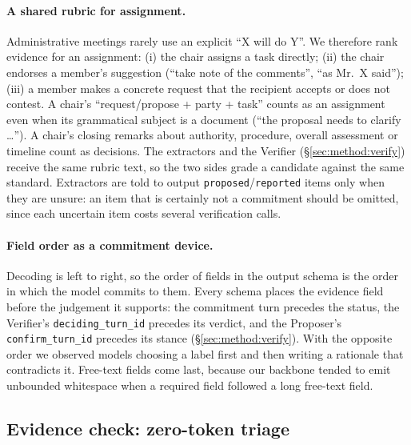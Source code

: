 \paragraph{A shared rubric for assignment.}
Administrative meetings rarely use an explicit ``X will do Y''.
We therefore rank evidence for an assignment:
(i) the chair assigns a task directly;
(ii) the chair endorses a member's suggestion (``take note of the comments'', ``as Mr.~X said'');
(iii) a member makes a concrete request that the recipient accepts or does not contest.
A chair's ``request/propose + party + task'' counts as an assignment even when its grammatical subject is a document (``the proposal needs to clarify \ldots'').
A chair's closing remarks about authority, procedure, overall assessment or timeline count as decisions.
The extractors and the Verifier (\S\ref{sec:method:verify}) receive the same rubric text, so the two sides grade a candidate against the same standard.
Extractors are told to output \texttt{proposed}/\texttt{reported} items only when they are unsure: an item that is certainly not a commitment should be omitted, since each uncertain item costs several verification calls.

\paragraph{Field order as a commitment device.}
Decoding is left to right, so the order of fields in the output schema is the order in which the model commits to them.
Every schema places the evidence field before the judgement it supports: the commitment turn precedes the status, the Verifier's \texttt{deciding\_turn\_id} precedes its verdict, and the Proposer's \texttt{confirm\_turn\_id} precedes its stance (\S\ref{sec:method:verify}).
With the opposite order we observed models choosing a label first and then writing a rationale that contradicts it.
Free-text fields come last, because our backbone tended to emit unbounded whitespace when a required field followed a long free-text field.

\subsection{Evidence check: zero-token triage}
\label{sec:method:evidence}

